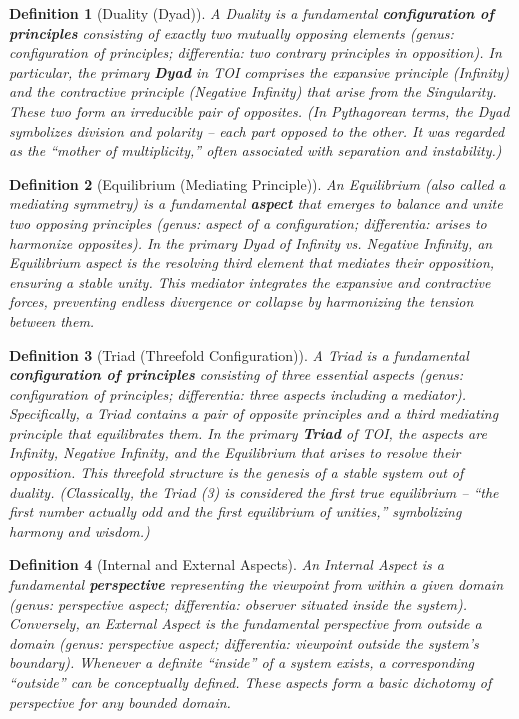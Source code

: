 \documentclass[11pt]{article}
\newtheorem{definition}{Definition}
\theoremstyle{plain}
\begin{document}
\begin{definition}[Duality (Dyad)]
A \emph{Duality} is a fundamental \textbf{configuration of principles} consisting of exactly two mutually opposing elements \textit{(genus: configuration of principles; differentia: two contrary principles in opposition)}. In particular, the primary \textbf{Dyad} in TOI comprises the expansive principle (Infinity) and the contractive principle (Negative Infinity) that arise from the Singularity. These two form an irreducible pair of opposites. \textit{(In Pythagorean terms, the Dyad symbolizes division and polarity – each part opposed to the other. It was regarded as the “mother of multiplicity,” often associated with separation and instability.)}
\end{definition}

\begin{definition}[Equilibrium (Mediating Principle)]
An \emph{Equilibrium} (also called a mediating symmetry) is a fundamental \textbf{aspect} that emerges to balance and unite two opposing principles \textit{(genus: aspect of a configuration; differentia: arises to harmonize opposites)}. In the primary Dyad of Infinity vs. Negative Infinity, an Equilibrium aspect is the resolving third element that mediates their opposition, ensuring a stable unity. This mediator integrates the expansive and contractive forces, preventing endless divergence or collapse by harmonizing the tension between them.
\end{definition}

\begin{definition}[Triad (Threefold Configuration)]
A \emph{Triad} is a fundamental \textbf{configuration of principles} consisting of three essential aspects \textit{(genus: configuration of principles; differentia: three aspects including a mediator)}. Specifically, a Triad contains a pair of opposite principles and a third mediating principle that equilibrates them. In the primary \textbf{Triad} of TOI, the aspects are Infinity, Negative Infinity, and the Equilibrium that arises to resolve their opposition. This threefold structure is the genesis of a stable system out of duality. \textit{(Classically, the Triad (3) is considered the first true equilibrium – “the first number actually odd and the first equilibrium of unities,” symbolizing harmony and wisdom.)}
\end{definition}

\begin{definition}[Internal and External Aspects]
An \emph{Internal Aspect} is a fundamental \textbf{perspective} representing the viewpoint from \textit{within} a given domain \textit{(genus: perspective aspect; differentia: observer situated inside the system)}. Conversely, an \emph{External Aspect} is the fundamental perspective from \textit{outside} a domain \textit{(genus: perspective aspect; differentia: viewpoint outside the system’s boundary)}. Whenever a definite “inside” of a system exists, a corresponding “outside” can be conceptually defined. These aspects form a basic dichotomy of perspective for any bounded domain.
\end{definition}
\end{document}
